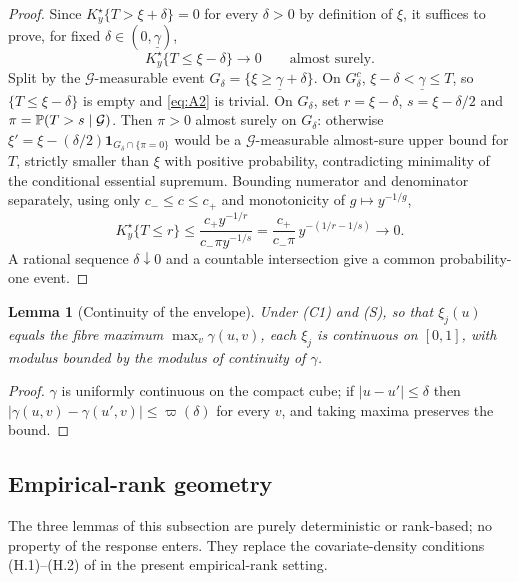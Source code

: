 \documentclass[bj,authoryear]{imsart}
\theoremstyle{plain}
\newtheorem{lemma}[theorem]{Lemma}
\begin{document}
\begin{appendix}
\begin{proof}
Since $K_y^\star\{T>\xi+\delta\}=0$ for every $\delta>0$ by definition of
$\xi$, it suffices to prove, for fixed
$\delta\in(0,\underline\gamma)$,
\begin{equation}
 K_y^\star\{T\le\xi-\delta\}\longrightarrow0\qquad\text{almost surely.}
 \label{eq:A2}
\end{equation}
Split by the $\mathcal G$-measurable event
$G_\delta=\{\xi\ge\underline\gamma+\delta\}$.  On $G_\delta^c$,
$\xi-\delta<\underline\gamma\le T$, so $\{T\le\xi-\delta\}$ is empty and
\eqref{eq:A2} is trivial.  On $G_\delta$, set $r=\xi-\delta$,
$s=\xi-\delta/2$ and $\pi=\mathbb P(T>s\mid\mathcal G)$.  Then $\pi>0$ almost
surely on $G_\delta$: otherwise
$\xi'=\xi-(\delta/2)\mathbf 1_{G_\delta\cap\{\pi=0\}}$ would be a
$\mathcal G$-measurable almost-sure upper bound for $T$, strictly smaller
than $\xi$ with positive probability, contradicting minimality of the
conditional essential supremum.  Bounding numerator and denominator
separately, using only $c_-\le c\le c_+$ and monotonicity of
$g\mapsto y^{-1/g}$,
\[
 K_y^\star\{T\le r\}
 \le\frac{c_+y^{-1/r}}{c_-\pi y^{-1/s}}
 =\frac{c_+}{c_-\pi}\,y^{-(1/r-1/s)}\longrightarrow0.
\]
A rational sequence $\delta\downarrow0$ and a countable intersection give
a common probability-one event.
\end{proof}

\begin{lemma}[Continuity of the envelope]\label{lem:app-envelope-cont}
Under (C1) and (S), so that $\xi_j(u)$ equals the fibre maximum
$\max_v\gamma(u,v)$, each $\xi_j$ is continuous on $[0,1]$, with
modulus bounded by the modulus of continuity of $\gamma$.
\end{lemma}

\begin{proof}
$\gamma$ is uniformly continuous on the compact cube; if
$|u-u'|\le\delta$ then $|\gamma(u,v)-\gamma(u',v)|\le\varpi(\delta)$ for
every $v$, and taking maxima preserves the bound.
\end{proof}

\subsection{Empirical-rank geometry}\label{app:rankgeom}

The three lemmas of this subsection are purely deterministic or
rank-based; no property of the response enters.  They replace the
covariate-density conditions (H.1)--(H.2) of
\citet{gardesPodgorny2025} in the present empirical-rank setting.


\end{appendix}
\end{document}
